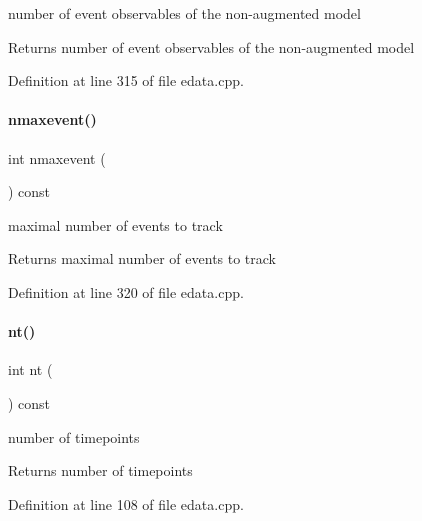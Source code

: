 number of event observables of the non-\/augmented model

\begin{DoxyReturn}{Returns}
number of event observables of the non-\/augmented model 
\end{DoxyReturn}


Definition at line 315 of file edata.\+cpp.

\mbox{\label{classamici_1_1_exp_data_ae6996d31ed94180a4b1d79412eb5ce31}} 
\paragraph{\texorpdfstring{nmaxevent()}{nmaxevent()}}
{\footnotesize\ttfamily int nmaxevent (\begin{DoxyParamCaption}{ }\end{DoxyParamCaption}) const}

maximal number of events to track

\begin{DoxyReturn}{Returns}
maximal number of events to track 
\end{DoxyReturn}


Definition at line 320 of file edata.\+cpp.

\mbox{\label{classamici_1_1_exp_data_a4c23d300cbe15b0afb1ee3731d47cc93}} 
\paragraph{\texorpdfstring{nt()}{nt()}}
{\footnotesize\ttfamily int nt (\begin{DoxyParamCaption}{ }\end{DoxyParamCaption}) const}

number of timepoints

\begin{DoxyReturn}{Returns}
number of timepoints 
\end{DoxyReturn}


Definition at line 108 of file edata.\+cpp.

